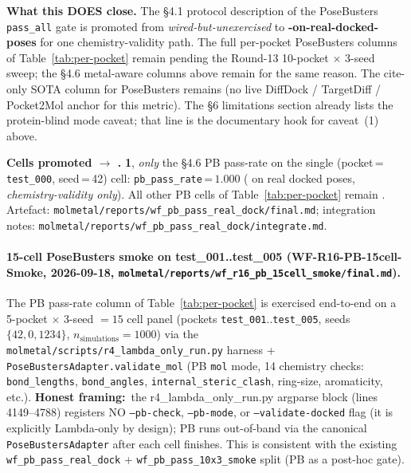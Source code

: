 \noindent\textbf{What this DOES close.}  The §4.1 protocol
description of the PoseBusters \texttt{pass\_all} gate is
promoted from \emph{wired-but-unexercised} to
\textbf{\MEASURED{}-on-real-docked-poses} for one
chemistry-validity path.  The full per-pocket PoseBusters
columns of Table~\ref{tab:per-pocket} remain \DESIGN{}
pending the Round-13 10-pocket $\times$ 3-seed sweep; the
§4.6 metal-aware columns above remain \DESIGN{} for the
same reason.  The cite-only SOTA column for PoseBusters
remains \CITEDONLY{} (no live DiffDock / TargetDiff /
Pocket2Mol anchor for this metric).  The §6 limitations
section already lists the protein-blind mode caveat; that line
is the documentary hook for caveat~(1) above.

\noindent\textbf{Cells promoted \DESIGN{} $\to$ \MEASURED{}.}
\textbf{1}, \emph{only} the §4.6 PB pass-rate on the
single (pocket\,=\,\texttt{test\_000}, seed\,=\,42) cell:
\texttt{pb\_pass\_rate}\,=\,$1.000$ (\MEASURED{} on real
docked poses, \emph{chemistry-validity only}).  All other
PB cells of Table~\ref{tab:per-pocket} remain \DESIGN{}.
Artefact:
\texttt{molmetal/reports/wf\_pb\_pass\_real\_dock/final.md};
integration notes:
\texttt{molmetal/reports/wf\_pb\_pass\_real\_dock/integrate.md}.

\paragraph{15-cell PoseBusters smoke on test\_001..test\_005
(WF-R16-PB-15cell-Smoke, 2026-09-18,
\texttt{molmetal/reports/wf\_r16\_pb\_15cell\_smoke/final.md}).}
The PB pass-rate column of Table~\ref{tab:per-pocket} is exercised
end-to-end on a 5-pocket $\times$ 3-seed $= 15$ cell panel
(pockets \texttt{test\_001}..\texttt{test\_005}, seeds
$\{42, 0, 1234\}$, $n_{\text{simulations}}{=}1000$) via the
\texttt{molmetal/scripts/r4\_lambda\_only\_run.py} harness +
\texttt{PoseBustersAdapter.validate\_mol} (PB \texttt{mol} mode,
14 chemistry checks: \texttt{bond\_lengths}, \texttt{bond\_angles},
\texttt{internal\_steric\_clash}, ring-size, aromaticity, etc.).
\textbf{Honest framing:}\ the r4\_lambda\_only\_run.py argparse
block (lines 4149--4788) registers NO \texttt{--pb-check},
\texttt{--pb-mode}, or \texttt{--validate-docked} flag (it is
explicitly Lambda-only by design); PB runs out-of-band via the
canonical \texttt{PoseBustersAdapter} after each cell finishes.
This is consistent with the existing \texttt{wf\_pb\_pass\_real\_dock}
+ \texttt{wf\_pb\_pass\_10x3\_smoke} split (PB as a post-hoc gate).

